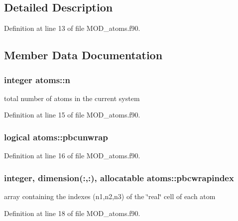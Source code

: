 \subsection{Detailed Description}


Definition at line 13 of file M\-O\-D\-\_\-atoms.\-f90.



\subsection{Member Data Documentation}
\hypertarget{classatoms_a0d62a0e654e2857f8d2a1ce12b6f6eb6}{
\subsubsection[{n}]{\setlength{\rightskip}{0pt plus 5cm}integer atoms\-::n}}\label{classatoms_a0d62a0e654e2857f8d2a1ce12b6f6eb6}


total number of atoms in the current system 



Definition at line 15 of file M\-O\-D\-\_\-atoms.\-f90.

\hypertarget{classatoms_abce3ab126f34592ae695a7216a3d7ebf}{
\subsubsection[{pbcunwrap}]{\setlength{\rightskip}{0pt plus 5cm}logical atoms\-::pbcunwrap}}\label{classatoms_abce3ab126f34592ae695a7216a3d7ebf}


Definition at line 16 of file M\-O\-D\-\_\-atoms.\-f90.

\hypertarget{classatoms_a80a7224531ab022e4b4fd8712abc17ea}{
\subsubsection[{pbcwrapindex}]{\setlength{\rightskip}{0pt plus 5cm}integer, dimension(\-:,\-:), allocatable atoms\-::pbcwrapindex}}\label{classatoms_a80a7224531ab022e4b4fd8712abc17ea}


array containing the indexes (n1,n2,n3) of the \char`\"{}real\char`\"{} cell of each atom 



Definition at line 18 of file M\-O\-D\-\_\-atoms.\-f90.

